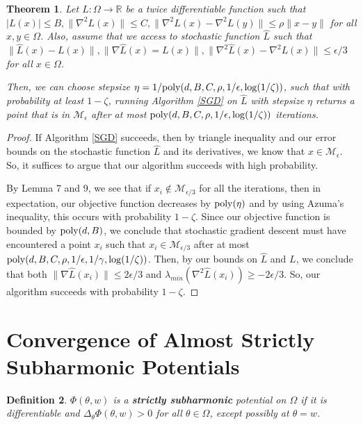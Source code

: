 \documentclass{article}
\newtheorem{theorem}{Theorem}[section]
\newtheorem{definition}[theorem]{Definition}
\newcommand{\R}{{\mathbb{R}}}
\begin{document}
\begin{theorem}\label{strongConverge}
Let $L :\Omega \to \R$ be a twice differentiable function such that $|L(x)| \leq B, \|\nabla^2 L(x)\| \leq C,\|\nabla^2L(x) -\nabla^2L(y)\| \leq \rho\|x - y\|$ for all $x,y\in\Omega$. Also, assume that we access to stochastic function $\widehat{L}$ such that $\|\widehat{L}(x) -L(x)\|, \|\nabla \widehat{L}(x) = L(x)\|, \|\nabla^2\widehat{L}(x) -\nabla^2 L(x)\| \leq \epsilon/3$ for all $x\in \Omega$.

Then, we can choose stepsize $\eta = 1/\mathrm{poly}(d,B,C,\rho,1/\epsilon,\log(1/\zeta))$, such that with probability at least $1-\zeta$, running Algorithm \ref{SGD} on $\widehat{L}$ with stepsize $\eta$  returns a point that is in $\mathcal{M}_\epsilon$ after at most $\mathrm{poly}(d,B,C,\rho,1/\epsilon, \log(1/\zeta))$ iterations.
\end{theorem}

\begin{proof}
If Algorithm \ref{SGD} succeeds, then by triangle inequality and our error bounds on the stochastic function $\widehat{L}$ and its derivatives, we know that $x \in \mathcal{M}_\epsilon$. So, it suffices to argue that our algorithm succeeds with high probability.

By \cite{GeHJY15} Lemma 7 and 9, we see that if
$x_i \not \in\mathcal{M}_{\epsilon/3}$ for all the iterations, then in
expectation, our objective function decreases by $\mathrm{poly}(\eta)$ and by
using Azuma's inequality, this occurs with probability
$1-\zeta$. Since our objective function is bounded by $\mathrm{poly}(d,B)$, we
conclude that stochastic gradient descent must have encountered a
point $x_i$ such that $x_i \in \mathcal{M}_{\epsilon/3}$ after at most
$\mathrm{poly}(d,B,C,\rho,1/\epsilon,1/\gamma, \log(1/\zeta))$. Then, by our
bounds on $\widehat{L}$ and $L$, we conclude that both
$\|\nabla\widehat{L}(x_i)\| \leq 2\epsilon/3$ and
$\lambda_{min}(\nabla^2 \widehat{L}(x_i)) \geq -2\epsilon/3$. So, our
algorithm succeeds with probability $1-\zeta$.
\end{proof}



\section{Convergence of Almost Strictly Subharmonic Potentials}\label{App:Subharm}


%
%
\begin{definition}
$\Phi(\theta,w)$ is a {\bf strictly subharmonic} potential on $\Omega$ if it is differentiable and $\Delta_\theta \Phi(\theta,w) > 0$ for all $\theta \in \Omega$, except possibly at $\theta = w$.
\end{definition}
\end{document}
